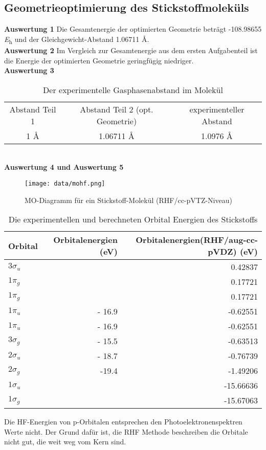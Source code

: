 \documentclass[12pt]{article}
\begin{document}
\begin{onehalfspace}
\subsection{Geometrieoptimierung des Stickstoffmoleküls}
\textbf{Auswertung 1}
Die Gesamtenergie der optimierten Geometrie beträgt -108.98655 \si{\hartree} und der Gleichgewicht-Abstand 1.06711 \si{\angstrom}.\\
\textbf{Auswertung 2}
Im Vergleich zur Gesamtenergie aus dem ersten Aufgabenteil ist die Energie der optimierten Geometrie geringfügig niedriger.\\
\textbf{Auswertung 3}\\
\begin{table}[!htpb]
\centering
\caption{Der experimentelle Gasphasenabstand im  Molekül \cite{wiberg653}}
\begin{tabular}{ccc}
\toprule
Abstand Teil 1 & Abstand Teil 2 (opt. Geometrie)  & experimenteller Abstand \\
1 \si{\angstrom} & 1.06711 \si{\angstrom} & 1.0976 \si{\angstrom} \\
\midrule
\bottomrule
\end{tabular}
\end{table}\\
\noindent
\textbf{Auswertung 4 und Auswertung 5}\\
\begin{figure}[!htpb]
   \centering
\texttt{[image: data/mohf.png]}
\caption{MO-Diagramm für ein Stickstoff-Molekül (RHF/cc-pVTZ-Niveau)}
\end{figure}

\begin{table}[!htpb]
\centering
\caption{Die experimentellen und berechneten Orbital Energien des Stickstoffs}
\begin{tabular}{lrr}
\toprule
Orbital & Orbitalenergien \cite{miessler} (eV) & Orbitalenergien(RHF/aug-cc-pVDZ) (eV)\\
\midrule
$3\sigma _u$ & &    0.42837\\
$1\pi _g$    & &    0.17721 \\
$1\pi _g$    & &    0.17721 \\
$1\pi _u$    & - 16.9 &  -0.62551 \\
$1\pi _u$    & - 16.9 & -0.62551 \\
$3\sigma _g$ &  - 15.5 & -0.63513 \\
$2\sigma _u$ & - 18.7 & -0.76739 \\
$2\sigma _g$ & -19.4  & -1.49206 \\
$1\sigma _u$ &  &-15.66636 \\
$1\sigma _g$ & &-15.67063 \\
\bottomrule
\end{tabular}
\end{table}
 Die HF-Energien von p-Orbitalen entsprechen den Photoelektronenspektren Werte \cite{miessler} nicht.
 Der Grund dafür ist, die RHF Methode beschreiben die Orbitale nicht gut, die weit weg vom Kern sind.


\end{onehalfspace}
\end{document}
